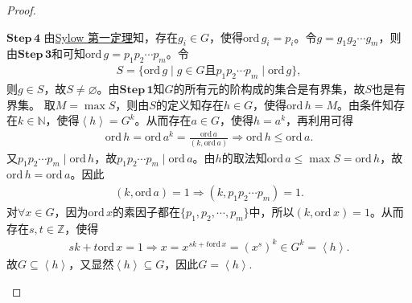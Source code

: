 \documentclass[../../main.tex]{subfiles}%
\begin{document}
\begin{proof}
\begin{enumerate}[(1)]
$\mathbf{Step\,4}$ 由\hyperref[theorem:Sylow 第一定理]{Sylow 第一定理}知，存在$g_i\in G$，使得$\mathrm{ord}\,g_i=p_i$。令$g=g_1g_2\cdots g_m$，则由$\mathbf{Step\,3}$和可知$\mathrm{ord}\,g=p_1p_2\cdots p_m$。令
\begin{align*}
S=\{ \mathrm{ord}\,g\mid g\in G\text{且}p_1p_2\cdots p_m\mid \mathrm{ord}\,g \},
\end{align*}
则$g\in S$，故$S\ne\varnothing$。由$\mathbf{Step\,1}$知$G$的所有元的阶构成的集合是有界集，故$S$也是有界集。
取$M=\max S$，则由$S$的定义知存在$h\in G$，使得$\mathrm{ord}\,h=M$。由条件知存在$k\in\mathbb{N}$，使得$\left< h \right> =G^k$。从而存在$a\in G$，使得$h=a^k$，再利用可得
\begin{align*}
\mathrm{ord}\,h=\mathrm{ord}\,a^k=\frac{\mathrm{ord}\,a}{(k,\mathrm{ord}\,a)}\Longrightarrow \mathrm{ord}\,h\leqslant \mathrm{ord}\,a.
\end{align*}
又$p_1p_2\cdots p_m\mid \mathrm{ord}\,h$，故$p_1p_2\cdots p_m\mid \mathrm{ord}\,a$。由$h$的取法知$\mathrm{ord}\,a\leqslant \max S=\mathrm{ord}\,h$，故$\mathrm{ord}\,h=\mathrm{ord}\,a$。因此
\begin{align*}
(k,\mathrm{ord}\,a)=1\Longrightarrow (k,p_1p_2\cdots p_m)=1.
\end{align*}
对$\forall x\in G$，因为$\mathrm{ord}\,x$的素因子都在$\{ p_1,p_2,\cdots,p_m \}$中，所以$(k,\mathrm{ord}\,x)=1$。从而存在$s,t\in\mathbb{Z}$，使得
\begin{align*}
sk+t\mathrm{ord}\,x=1\Longrightarrow x=x^{sk+t\mathrm{ord}\,x}=(x^s)^k\in G^k=\left< h \right>.
\end{align*}
故$G\subseteq\left< h \right>$，又显然$\left< h \right>\subseteq G$，因此$G=\left< h \right>$.

\end{enumerate}
\end{proof}
\end{document}
